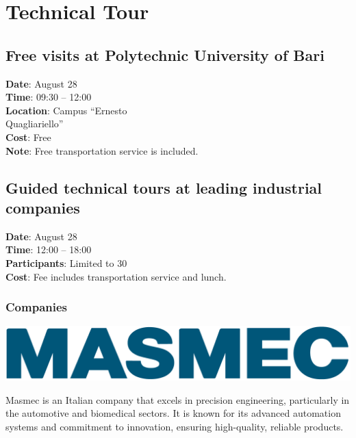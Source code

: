 \documentclass[
	openany, %
	parskip=full, %
	12pt, %
	a4paper, %
]{conferencebooklet} %
\begin{document}

\chapter{Technical Tour}
\begin{multicols*}{2}
    \section{Free visits at Polytechnic University of Bari}
    \textbf{Date}: August 28 \\
    \textbf{Time}: 09:30 – 12:00 \\
    \textbf{Location}: Campus “Ernesto \\ Quagliariello” \\
    \textbf{Cost}: Free \\
    \textbf{Note}: Free transportation service is included. 

    \vfill\null
    \columnbreak
    
    \section{Guided technical tours at leading industrial companies}
    \textbf{Date}: August 28 \\
    \textbf{Time}: 12:00 – 18:00 \\
    \textbf{Participants}: Limited to 30 \\
    \textbf{Cost}: Fee includes transportation service and lunch.

    \subsection*{Companies}
    \includegraphics[width=0.8\linewidth]{logos/masmec.png} 
    
    Masmec is an Italian company that excels in precision engineering, particularly in the automotive and biomedical sectors. It is known for its advanced automation systems and commitment to innovation, ensuring high-quality, reliable products.
    

\end{multicols*}
\end{document}
